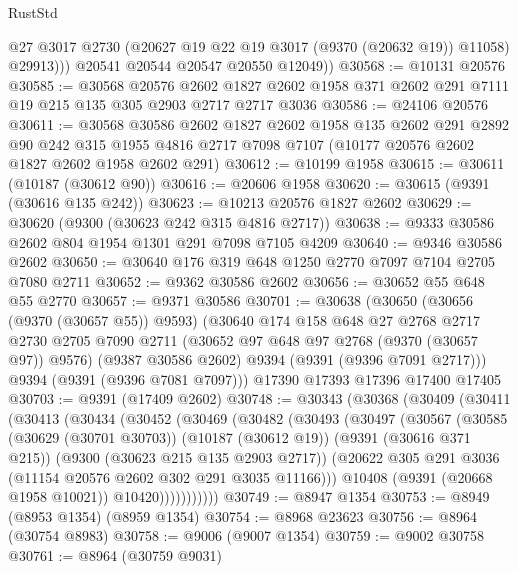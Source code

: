 \begin{lexlean}{RustStd}
\begin{coremodule}
              @27
              @3017
              @2730
              (@20627 @19 @22 @19 @3017 (@9370 (@20632 @19)) @11058)
              @29913)))
        @20541
        @20544
        @20547
        @20550
        @12049))
@30568 := @10131 @20576
@30585 := @30568
    @20576
    @2602
    @1827
    @2602
    @1958
    @371
    @2602
    @291
    @7111
    @19
    @215
    @135
    @305
    @2903
    @2717
    @2717
    @3036
@30586 := @24106 @20576
@30611 := @30568
    @30586
    @2602
    @1827
    @2602
    @1958
    @135
    @2602
    @291
    @2892
    @90
    @242
    @315
    @1955
    @4816
    @2717
    @7098
    @7107
    (@10177 @20576 @2602 @1827 @2602 @1958 @2602 @291)
@30612 := @10199 @1958
@30615 := @30611 (@10187 (@30612 @90))
@30616 := @20606 @1958
@30620 := @30615 (@9391 (@30616 @135 @242))
@30623 := @10213 @20576 @1827 @2602
@30629 := @30620 (@9300 (@30623 @242 @315 @4816 @2717))
@30638 := @9333 @30586 @2602 @804 @1954 @1301 @291 @7098 @7105 @4209
@30640 := @9346 @30586 @2602
@30650 := @30640 @176 @319 @648 @1250 @2770 @7097 @7104 @2705 @7080 @2711
@30652 := @9362 @30586 @2602
@30656 := @30652 @55 @648 @55 @2770
@30657 := @9371 @30586
@30701 := @30638
    (@30650
      (@30656 (@9370 (@30657 @55)) @9593)
      (@30640
        @174
        @158
        @648
        @27
        @2768
        @2717
        @2730
        @2705
        @7090
        @2711
        (@30652 @97 @648 @97 @2768 (@9370 (@30657 @97)) @9576)
        (@9387 @30586 @2602)
        @9394
        (@9391 (@9396 @7091 @2717)))
      @9394
      (@9391 (@9396 @7081 @7097)))
    @17390
    @17393
    @17396
    @17400
    @17405
@30703 := @9391 (@17409 @2602)
@30748 := @30343
    (@30368
      (@30409
        (@30411
          (@30413
            (@30434
              (@30452
                (@30469
                  (@30482
                    (@30493
                      (@30497
                        (@30567
                          (@30585
                            (@30629 (@30701 @30703))
                            (@10187 (@30612 @19))
                            (@9391 (@30616 @371 @215))
                            (@9300 (@30623 @215 @135 @2903 @2717))
                            (@20622 @305 @291 @3036 (@11154 @20576 @2602 @302 @291 @3035 @11166)))
                          @10408
                          (@9391 (@20668 @1958 @10021))
                          @10420)))))))))))
@30749 := @8947 @1354
@30753 := @8949 (@8953 @1354) (@8959 @1354)
@30754 := @8968 @23623
@30756 := @8964 (@30754 @8983)
@30758 := @9006 (@9007 @1354)
@30759 := @9002 @30758
@30761 := @8964 (@30759 @9031)

\end{coremodule}
\end{lexlean}
